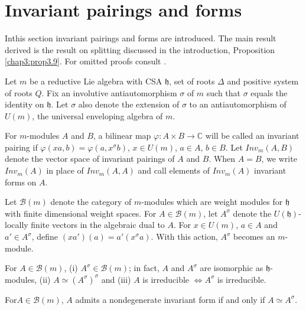 
\chapter{Invariant pairings and forms}\label{sec3}

In\pageoriginale this section invariant pairings and forms are
introduced. The main result derived is the result on splitting
discussed in the introduction, Proposition \ref{chap3:prop3.9}. For
omitted proofs consult \cite[\S \ \ref{sec6}]{key15}.

Let $m$ be a reductive Lie algebra with CSA $\mathfrak{h}$, set of
roots $\Delta$ and positive system of roots $Q$. Fix an involutive
antiautomorphism $\sigma$ of $m$ such that $\sigma$ equals the
identity on $\mathfrak{h}$. Let $\sigma$ also denote the extension of
$\sigma$ to an antiautomorphism of $U(m)$, the universal enveloping
algebra of $m$. 

\begin{definition}\label{chap3:def3.1}
For $m$-modules $A$ and $B$, a bilinear map $\varphi: A \times B \to
\mathbb{C}$ will be called an invariant pairing if $\varphi(xa, b)=
\varphi (a,x^\sigma b)$, $x \in U(m)$, $a \in A$, $b \in B$. Let
$Inv_m(A,B)$ denote the vector space of invariant pairings of $A$ and
$B$. When $A=B$, we write $Inv_m(A)$ in place of $Inv_m(A,A)$ and call
elements of $Inv_m(A)$ invariant forms on $A$. 
\end{definition}

Let $\mathscr{B}(m)$ denote the category of $m$-modules which are
weight modules for $\mathfrak{h}$ with finite dimensional weight
spaces. For $A \in \mathscr{B}(m)$, let $A^\sigma$ denote the
$U(\mathfrak{h})$-locally finite vectors in the algebraic dual to
$A$. For $x \in U (m)$, $a \in A$ and $a' \in A^\sigma$, define
$(xa') (a) = a' (x^\sigma a)$. With this action, $A^\sigma$ becomes an
$m$-module. 

\begin{lemma}\label{chap3:lem3.2}%
For $A \in \mathscr{B}(m)$, (i) $A^\sigma \in \mathscr{B}(m)$; in
fact, $A$ and $A^\sigma$ are isomorphic as $\mathfrak{h}$-modules,
(ii) $A \simeq (A^\sigma)^\sigma$ and (iii) $A$ is irreducible
$\Leftrightarrow A^\sigma$ is irreducible.
\end{lemma}

\begin{lemma}\label{chap3:lem3.3}
For\pageoriginale $A \in \mathscr{B} (m)$, $A$ admits a nondegenerate
invariant form if and only if $A \simeq A^\sigma$.  
\end{lemma}

